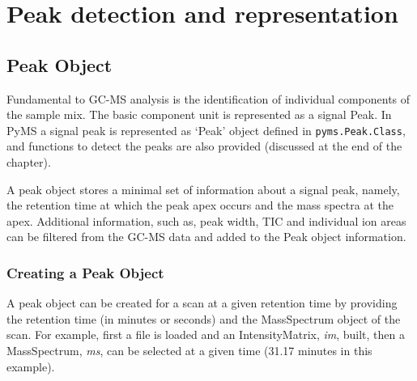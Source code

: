 

\chapter{Peak detection and representation}

\section{Peak Object}

Fundamental to GC-MS analysis is the identification of individual components of
the sample mix. The basic component unit is represented as a signal Peak. In
PyMS a signal peak is represented as `Peak' object defined in
{\tt pyms.Peak.Class}, and functions to detect the peaks are also provided
(discussed at the end of the chapter).

A peak object stores a minimal set of information about a signal peak, namely,
the retention time at which the peak apex occurs and the mass spectra at the
apex. Additional information, such as, peak width, TIC and individual ion areas
can be filtered from the GC-MS data and added to the Peak object information.

\subsection{Creating a Peak Object}


A peak object can be created for a scan at a given retention time by providing
the retention time (in minutes or seconds) and the MassSpectrum object of the
scan. For example, first a file is loaded and an IntensityMatrix, {\em
im}, built, then a MassSpectrum, {\em ms}, can be selected at a given
time (31.17 minutes in this example).

